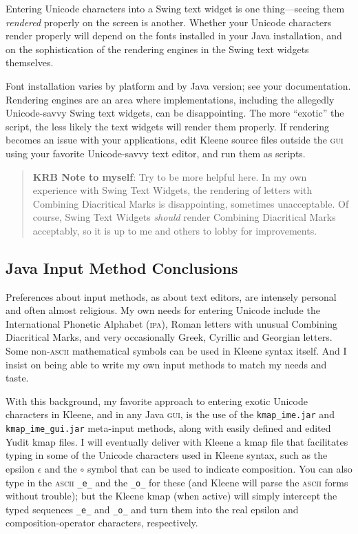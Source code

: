 \documentclass[letterpaper,12pt]{article}
\newcommand{\acro}{\textsc}
\begin{document}
Entering Unicode characters into a Swing text widget is one
thing---seeing them \emph{rendered} properly on the screen is another.
Whether your Unicode characters render properly will depend on the fonts
installed in your Java installation, and on the sophistication of the
rendering engines in the Swing text widgets themselves.

Font installation varies by platform and by Java version; see your
documentation.  Rendering engines are an area where
implementations, including the allegedly Unicode-savvy Swing text
widgets, can be disappointing.  The more ``exotic'' the script,
the less likely the text widgets will render them properly.  If
rendering becomes an issue with your applications, edit 
Kleene source files outside the \acro{gui} using your favorite Unicode-savvy text editor,
and run them as scripts.

\begin{quote}
\textbf{KRB Note to myself}: Try to be more helpful here.  In my own
experience with Swing Text Widgets, the rendering of letters with
Combining Diacritical Marks is disappointing, sometimes unacceptable.  Of
course, Swing Text Widgets \emph{should} render Combining Diacritical
Marks acceptably, so it is up to me and others to lobby for improvements.
\end{quote}

\subsection{Java Input Method Conclusions}

Preferences about input methods, as about text editors, are intensely
personal and often almost religious.  My own needs for entering Unicode
include the International Phonetic Alphabet (\acro{ipa}), Roman letters
with unusual Combining Diacritical Marks, and very occasionally Greek,
Cyrillic and Georgian letters.  Some non-\acro{ascii} mathematical
symbols can be used in Kleene syntax itself.  And I insist on being able
to write my own input methods to match my needs and taste.

With this background, my favorite approach to entering exotic Unicode
characters in Kleene, and in any Java \acro{gui}, is the use of the
\texttt{kmap\_ime.jar} and \texttt{kmap\_ime\_gui.jar} meta-input
methods, along with easily defined and edited Yudit kmap files.  I will
eventually deliver with Kleene a kmap file that facilitates typing in
some of the Unicode characters used in Kleene syntax, such as the epsilon
$\epsilon$ and the $\circ$ symbol that can be used to indicate
composition.  You can also type in the \acro{ascii} \verb!_e_! and the
\verb!_o_! for these (and Kleene will parse the \acro{ascii} forms
without trouble); but the Kleene kmap (when active) will simply intercept
the typed sequences \verb!_e_! and \verb!_o_! and turn them into the real
epsilon and composition-operator characters, respectively.
 
\end{document}
